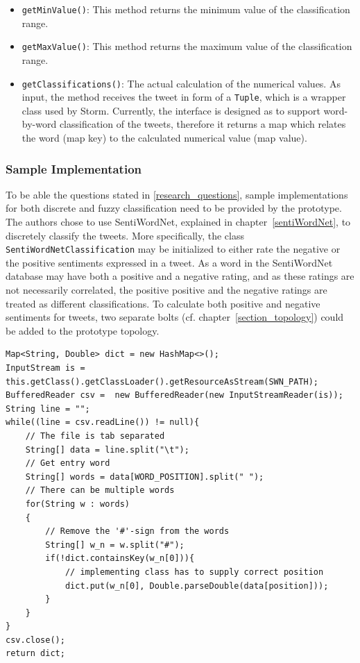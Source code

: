 \documentclass[a4paper]{article}
\begin{document}
\begin{itemize}
\item \texttt{getMinValue()}: This method returns the minimum value of the classification range.
\item \texttt{getMaxValue()}: This method returns the maximum value of the classification range.
\item \texttt{getClassifications()}: The actual calculation of the numerical values. As input, the method receives the tweet in form of a \texttt{Tuple}, which is a wrapper class used by Storm. Currently, the interface is designed as to support word-by-word classification of the tweets, therefore it returns a map which relates the word (map key) to the calculated numerical value (map value).
\end{itemize}

\subsubsection{Sample Implementation}
To be able the questions stated in \ref{research_questions}, sample implementations for both discrete and fuzzy classification need to be provided by the prototype. The authors chose to use SentiWordNet, explained in chapter~\ref{sentiWordNet}, to discretely classify the tweets. More specifically, the class \texttt{SentiWordNetClassification} may be initialized to either rate the negative or the positive sentiments expressed in a tweet. As a word in the SentiWordNet database may have both a positive and a negative rating, and as these ratings are not necessarily correlated, the positive positive and the negative ratings are treated as different classifications. To calculate both positive and negative sentiments for tweets, two separate bolts (cf. chapter~\ref{section_topology}) could be added to the prototype topology.\\

\begin{lstlisting}
Map<String, Double> dict = new HashMap<>();
InputStream is = this.getClass().getClassLoader().getResourceAsStream(SWN_PATH);
BufferedReader csv =  new BufferedReader(new InputStreamReader(is));
String line = "";
while((line = csv.readLine()) != null){
	// The file is tab separated
	String[] data = line.split("\t");
	// Get entry word
	String[] words = data[WORD_POSITION].split(" ");
	// There can be multiple words
	for(String w : words)
	{
		// Remove the '#'-sign from the words
		String[] w_n = w.split("#");
		if(!dict.containsKey(w_n[0])){
			// implementing class has to supply correct position
			dict.put(w_n[0], Double.parseDouble(data[position]));
		}
	}
}
csv.close();
return dict;
\end{lstlisting}
\end{document}
